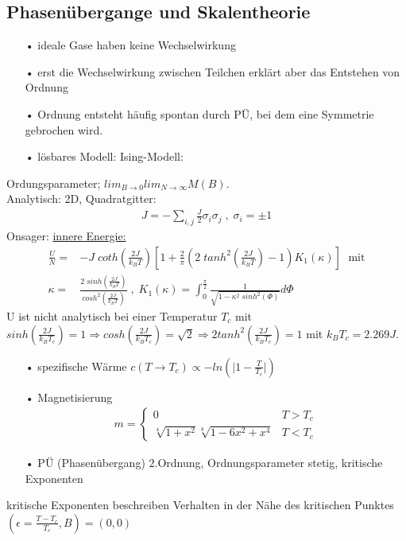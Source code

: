 \documentclass[12pt]{article}
\begin{document}
\subsection{Phasenübergange und Skalentheorie}
\begin{itemize}
\item[•] ideale Gase haben keine Wechselwirkung
\item[•] erst die Wechselwirkung zwischen Teilchen erklärt aber das Entstehen von Ordnung
\item[•] Ordnung entsteht häufig spontan durch PÜ, bei dem eine Symmetrie gebrochen wird.
\item[•]lösbares Modell: Ising-Modell: %
\end{itemize}
Ordungsparameter; $ lim_{B \to 0} lim_{N \to \infty} M(B)$.\\
Analytisch: 2D, Quadratgitter: \begin{align}
J= - \sum_{i,j} \frac{J}{2}\sigma_i \sigma_j \; , \; \sigma_i=\pm 1
\end{align}
Onsager: \underline{innere Energie:}
\begin{align}
\frac{U}{N}= &- J \; coth( \frac{2J}{k_BT}) \left[ 1 + \frac{2}{\pi} \left( 2 \; tanh^2 \left( \frac{2J}{k_BT} \right) - 1 \right) K_1(\kappa ) \right] \; \mbox{ mit} \\
\kappa=& \frac{2 \; sinh \left( \frac{2J}{k_BT} \right)}{cosh^2 \left( \frac{2J}{k_BT} \right) } \; , \; K_1(\kappa)= \int_0^\frac{\pi}{2} \frac{1}{\sqrt{1- \kappa^2 \; sinh^2(\Phi)}} d\Phi
\end{align}
U ist nicht analytisch bei einer Temperatur $T_c$ mit $sinh(\frac{2J}{k_BT_c} ) = 1 \Rightarrow cosh(\frac{2J}{k_BT_c})= \sqrt{2} \Rightarrow 2 tanh^2( \frac{2J}{k_B T_c}) =1$ mit $k_B T_c = 2.269 J$. %
\begin{itemize}
\item[•] spezifische Wärme $c(T \to T_c) \propto - ln \left(\vert 1- \frac{T}{T_c}\vert \right)$
\item[•]Magnetisierung 
\begin{align}
m=
\begin{cases}
0 & T>T_c \\
\sqrt[4]{1+x^2} \sqrt[8]{1-6x^2 +x^4} & T<T_c
\end{cases}
\end{align}
\item[•]PÜ (Phasenübergang) $2.$Ordnung, Ordnungsparameter stetig, kritische Exponenten
\end{itemize}
kritische Exponenten beschreiben Verhalten in der Nähe des kritischen Punktes $(\epsilon = \frac{T - T_c}{T_c} , B) = (0,0)$ \\
\end{document}
